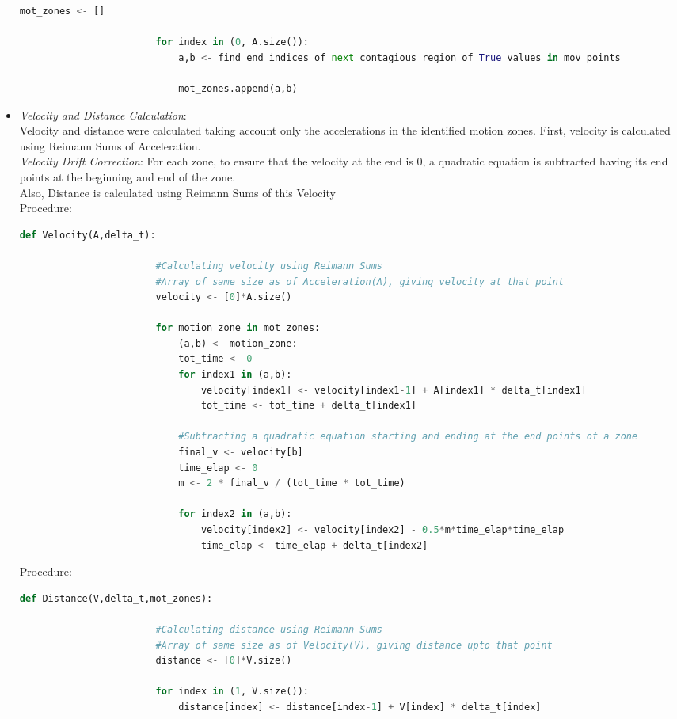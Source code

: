 \documentclass{article}
\begin{document}
\begin{itemize}
\begin{lstlisting}[language=Python, caption=MotionZones()]
						mot_zones <- []

						for index in (0, A.size()):
							a,b <- find end indices of next contagious region of True values in mov_points

							mot_zones.append(a,b)
				\end{lstlisting}


				\item \textit{Velocity and Distance Calculation}:\\ Velocity and distance were calculated taking account only the accelerations in the identified motion zones. First, velocity is calculated using Reimann Sums of Acceleration. 
				\\ \textit{Velocity Drift Correction}: For each zone, to ensure that the velocity at the end is 0, a quadratic equation is subtracted having its end points at the beginning and end of the zone. \\Also, Distance is calculated using Reimann Sums of this Velocity
				\\ Procedure:
				\begin{lstlisting}[language=Python, caption=Velocity()]
					def Velocity(A,delta_t):

						#Calculating velocity using Reimann Sums
						#Array of same size as of Acceleration(A), giving velocity at that point 	
						velocity <- [0]*A.size()

						for motion_zone in mot_zones:
							(a,b) <- motion_zone:
							tot_time <- 0
							for index1 in (a,b):
								velocity[index1] <- velocity[index1-1] + A[index1] * delta_t[index1]
								tot_time <- tot_time + delta_t[index1]

							#Subtracting a quadratic equation starting and ending at the end points of a zone
							final_v <- velocity[b]
							time_elap <- 0
							m <- 2 * final_v / (tot_time * tot_time)

							for index2 in (a,b):
								velocity[index2] <- velocity[index2] - 0.5*m*time_elap*time_elap
								time_elap <- time_elap + delta_t[index2]
				\end{lstlisting}
				 Procedure:
				\begin{lstlisting}[language=Python, caption=Distance()]
					def Distance(V,delta_t,mot_zones):

						#Calculating distance using Reimann Sums
						#Array of same size as of Velocity(V), giving distance upto that point 	
						distance <- [0]*V.size()

						for index in (1, V.size()):
							distance[index] <- distance[index-1] + V[index] * delta_t[index]
				\end{lstlisting}
				\end{itemize}
\end{document}
